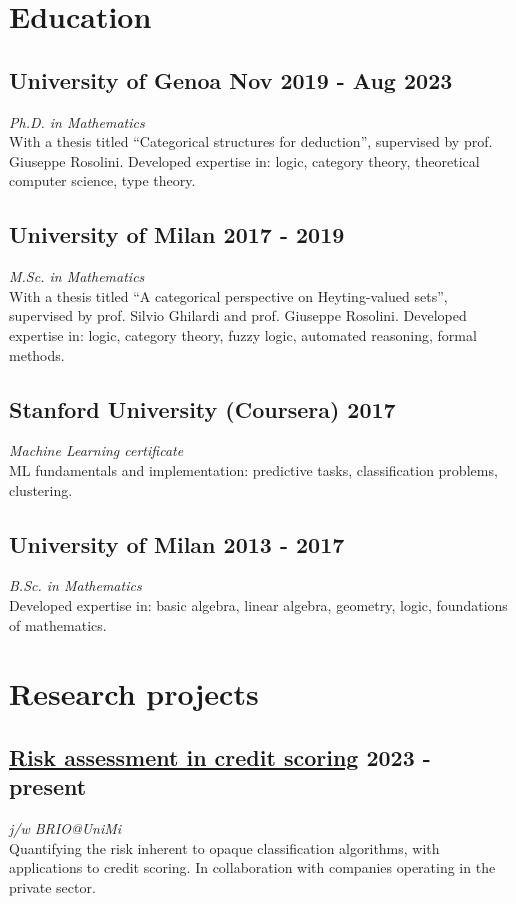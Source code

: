 \documentclass[a4paper,9pt]{article}
\begin{document}
\section*{ Education}

\subsection*{University of Genoa \hfill Nov 2019 - Aug 2023}
\textit{Ph.D. in Mathematics}\\
With a thesis titled ``Categorical structures for deduction'', supervised by prof. Giuseppe Rosolini. Developed expertise in: logic, category theory, theoretical computer science, type theory.

\subsection*{University of Milan \hfill 2017 - 2019}
\textit{M.Sc. in Mathematics}\\
With a thesis titled ``A categorical perspective on Heyting-valued sets'', supervised by prof. Silvio Ghilardi and prof. Giuseppe Rosolini. Developed expertise in: logic, category theory, fuzzy logic, automated reasoning, formal methods.

\subsection*{Stanford University (Coursera) \hfill 2017}
\textit{Machine Learning certificate}\\
ML fundamentals and implementation: predictive tasks, classification problems, clustering.

\subsection*{University of Milan \hfill 2013 - 2017}
\textit{B.Sc. in Mathematics}\\
Developed expertise in: basic algebra, linear algebra, geometry, logic, foundations of mathematics.

\section*{ Research projects}
\subsection*{\href{https://arxiv.org/abs/2406.03292}{Risk assessment in credit scoring} \hfill 2023 - present}
\textit{j/w BRIO@UniMi}\\
Quantifying the risk inherent to opaque classification algorithms, with applications to credit scoring. In collaboration with companies operating in the private sector.
\end{document}
